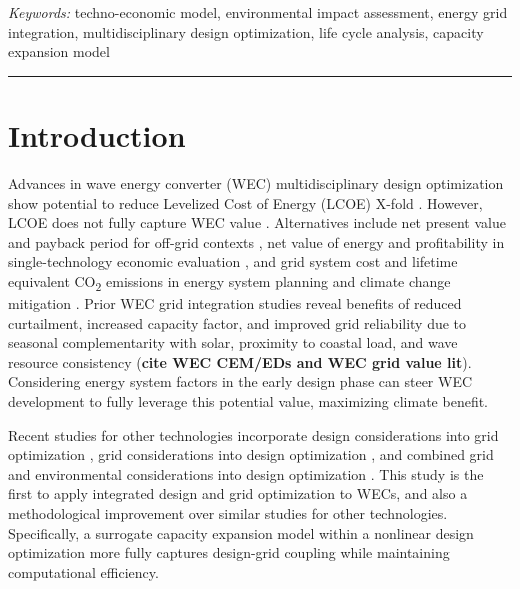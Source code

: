 \documentclass[10pt,twoside]{article}
\begin{document}
\vspace{.5\baselineskip}
\textit{Keywords:} techno-economic model, environmental impact assessment, energy grid integration, multidisciplinary design optimization, life cycle analysis, capacity expansion model

\noindent\rule{\textwidth}{0.4pt}

\section{Introduction}
Advances in wave energy converter (WEC) multidisciplinary design optimization show potential to reduce Levelized Cost of Energy (LCOE) X-fold \cite{mccabe_leveraging_2025}.
However, LCOE does not fully capture WEC value \cite{mowers_evaluation_2021,moraski_beyond_2025}.
Alternatives include net present value and payback period for off-grid contexts \cite{jenne_powering_2021}, net value of energy and profitability in single-technology economic evaluation \cite{mowers_evaluation_2021,makaremi_economic_2025}, and grid system cost and lifetime equivalent CO\textsubscript{2} emissions in energy system planning and climate change mitigation \cite{moraski_beyond_2025}.
Prior WEC grid integration studies reveal benefits of reduced curtailment, increased capacity factor, and improved grid reliability due to seasonal complementarity with solar, proximity to coastal load, and wave resource consistency (\textbf{cite WEC CEM/EDs and WEC grid value lit}).
Considering energy system factors in the early design phase can steer WEC development to fully leverage this potential value, maximizing climate benefit.

Recent studies for other technologies incorporate design considerations into grid optimization \cite{schwartz_value_2023,ricks_value_2022}, grid considerations into design optimization \cite{mehta_designing_2024}, and combined grid and environmental considerations into design optimization \cite{canet_eco-conscious_2023,kainz_how_2024}.
This study is the first to apply integrated design and grid optimization to WECs, and also a methodological improvement over similar studies for other technologies. 
Specifically, a surrogate capacity expansion model within a nonlinear design optimization more fully captures design-grid coupling while maintaining computational efficiency.
\end{document}
